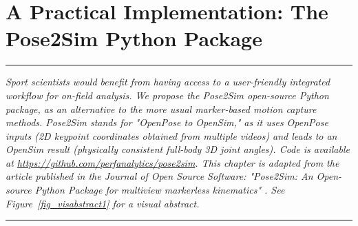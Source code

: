 
\lhead[\fancyplain{}{\leftmark}]%
      {\fancyplain{}{}} %
\chead[\fancyplain{}{}]%
      {\fancyplain{}{}}
\rhead[\fancyplain{}{}]%
      {\fancyplain{}{\rightmark}}%
\lfoot[\fancyplain{}{}]%
      {\fancyplain{}{}}
\cfoot[\fancyplain{}{\thepage}]%
      {\fancyplain{}{\thepage}} %
\rfoot[\fancyplain{}{}]%
     {\fancyplain{}{\scriptsize}}



\chapter{A Practical Implementation: The Pose2Sim Python Package}
\label{ch:3}


\begin{center}
\rule{0.7\linewidth}{.5pt}
\begin{minipage}{0.7\linewidth}
\smallskip

\textit{Sport scientists would benefit from having access to a user-friendly integrated workflow for on-field analysis. We propose the Pose2Sim open-source Python package, as an alternative to the more usual marker-based motion capture methods. Pose2Sim stands for "OpenPose to OpenSim," as it uses OpenPose inputs (2D keypoint coordinates obtained from multiple videos) and leads to an OpenSim result (physically consistent full-body 3D joint angles). Code is available at \url{https://github.com/perfanalytics/pose2sim}. \newline \newline
This chapter is adapted from the article published in the Journal of Open Source Software: "Pose2Sim: An Open-source Python Package for multiview markerless kinematics" \cite{Pagnon2022b}. See Figure~\ref{fig_visabstract1} for a visual abstract.}

\end{minipage}
\smallskip
\rule{0.7\linewidth}{.5pt}
\end{center}

